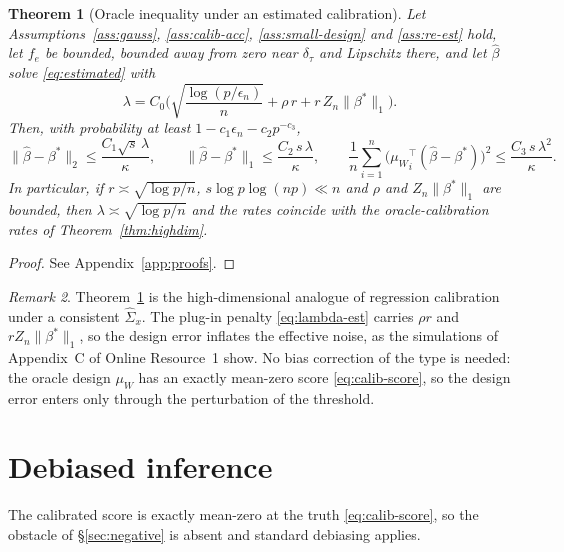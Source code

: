 \documentclass[12pt,a4paper]{article}
\newtheorem{theorem}{Theorem}[section]
\theoremstyle{definition}
\theoremstyle{remark}
\newtheorem{remark}[theorem]{Remark}
\newcommand{\betas}{\beta^*}
\newcommand{\muv}{\mu_W}
\begin{document}
\begin{theorem}[Oracle inequality under an estimated calibration]
\label{thm:estimated}
Let Assumptions~\ref{ass:gauss}, \ref{ass:calib-acc}, \ref{ass:small-design} and
\ref{ass:re-est} hold, let $f_e$ be bounded, bounded away from zero near $\delta_\tau$ and
Lipschitz there, and let $\hat\beta$ solve \eqref{eq:estimated} with
\begin{equation}
\lambda = C_0\Big(\sqrt{\frac{\log(p/\epsilon_n)}{n}} + \rho\,r + r\,Z_n\|\betas\|_1\Big).
\label{eq:lambda-est}
\end{equation}
Then, with probability at least $1-c_1\epsilon_n-c_2p^{-c_3}$,
\begin{equation}
\|\hat\beta-\betas\|_2 \le \frac{C_1\sqrt s\,\lambda}{\kappa},
\qquad
\|\hat\beta-\betas\|_1 \le \frac{C_2\,s\,\lambda}{\kappa},
\qquad
\frac1n\sum_{i=1}^n\big({\muv}_i^\top(\hat\beta-\betas)\big)^2 \le \frac{C_3\,s\,\lambda^2}{\kappa}.
\end{equation}
In particular, if $r\asymp\sqrt{\log p/n}$, $s\log p\log(np)\ll n$ and $\rho$ and
$Z_n\|\betas\|_1$ are bounded, then $\lambda\asymp\sqrt{\log p/n}$ and the rates coincide
with the oracle-calibration rates of Theorem~\ref{thm:highdim}.
\end{theorem}

\begin{proof}
See Appendix~\ref{app:proofs}.
\end{proof}

\begin{remark}
Theorem~\ref{thm:estimated} is the high-dimensional analogue of regression calibration
under a consistent $\hat\Sigma_x$. The plug-in penalty \eqref{eq:lambda-est} carries
$\rho r$ and $rZ_n\|\betas\|_1$, so the design error inflates the effective noise, as the
simulations of Appendix~C of Online Resource~1 show. No bias correction of the
\citet{loh2012highdim} type is needed: the oracle design $\muv$ has an exactly mean-zero
score \eqref{eq:calib-score}, so the design error enters only through the perturbation of
the threshold.
\end{remark}

\section{Debiased inference}
\label{sec:debiasing}

The calibrated score is exactly mean-zero at the truth \eqref{eq:calib-score}, so the
obstacle of \S\ref{sec:negative} is absent and standard debiasing applies.
\end{document}
